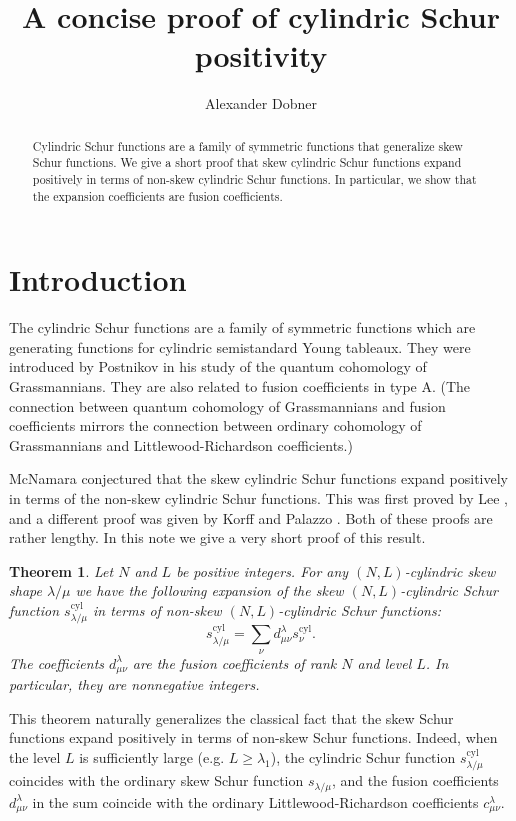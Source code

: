 \documentclass[a4paper,11pt,twoside]{amsart}
\newcommand{\cyl}{\mathrm{cyl}}
\newtheorem{theorem}{Theorem}
\begin{document}
\title{A concise proof of cylindric Schur positivity}
\author{Alexander Dobner}
\begin{abstract}
Cylindric Schur functions are a family of symmetric functions that generalize skew Schur functions. We give a short proof that skew cylindric Schur functions expand positively in terms of non-skew cylindric Schur functions. In particular, we show that the expansion coefficients are fusion coefficients.
\end{abstract}
\maketitle
\vspace{-1em}

\section{Introduction}
The cylindric Schur functions are a family of symmetric functions which are generating functions for cylindric semistandard Young tableaux. They were introduced by Postnikov \cite{postnikov2005} in his study of the quantum cohomology of Grassmannians. They are also related to fusion coefficients in type A. (The connection between quantum cohomology of Grassmannians and fusion coefficients mirrors the connection between ordinary cohomology of Grassmannians and Littlewood-Richardson coefficients.)

McNamara \cite{mcnamara2006} conjectured that the skew cylindric Schur functions expand positively in terms of the non-skew cylindric Schur functions. This was first proved by Lee \cite{lee2019}, and a different proof was given by Korff and Palazzo \cite{korff2020p}. Both of these proofs are rather lengthy. In this note we give a very short proof of this result.

\begin{theorem}
Let $N$ and $L$ be positive integers. For any $(N,L)$-cylindric skew shape $\lambda/\mu$ we have the following expansion of the skew $(N,L)$-cylindric Schur function $s^\cyl_{\lambda/\mu}$ in terms of non-skew $(N,L)$-cylindric Schur functions:
\[s^\cyl_{\lambda/\mu} = \sum_{\nu} d_{\mu\nu}^{\lambda} s^\cyl_{\nu}.\]
The coefficients $d_{\mu\nu}^{\lambda}$ are the fusion coefficients of rank $N$ and level $L$. In particular, they are nonnegative integers.
\end{theorem}

This theorem naturally generalizes the classical fact that the skew Schur functions expand positively in terms of non-skew Schur functions. Indeed, when the level $L$ is sufficiently large (e.g. $L \geq \lambda_1$), the cylindric Schur function $s^\cyl_{\lambda/\mu}$ coincides with the ordinary skew Schur function $s_{\lambda/\mu}$, and the fusion coefficients $d_{\mu\nu}^{\lambda}$ in the sum coincide with the ordinary Littlewood-Richardson coefficients $c_{\mu\nu}^{\lambda}$.
\end{document}
